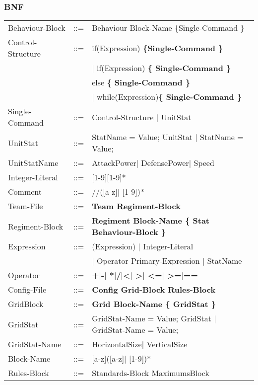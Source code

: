 	\subsubsection{BNF}
		\begin{tabular}{ l l l }
			Behaviour-Block	   &	::=	 & Behaviour Block-Name \{Single-Command \} \\
			Control-Structure  &  	::=  & if(Expression) \bf{\{}Single-Command \bf{\}}  \\
							   &		 & $\mid$ if(Expression) \bf{\{ }Single-Command \bf{\}} \\
							   &   		 & else \bf{\{ }Single-Command \bf{\} } \\					   
							   &   		 & $\mid$ while(Expression)\bf{\{ } Single-Command \bf{\}} \\
			Single-Command     &	::=  & Control-Structure $\mid$ UnitStat \\
			UnitStat		   &	::=  & StatName = Value; UnitStat $\mid$ StatName = Value; \\
			UnitStatName	   &	::=	 & AttackPower$\mid$ DefensePower$\mid$ Speed \\
			Integer-Literal    &	::=  & [1-9][1-9]* \\
			Comment			   &	::=	 & //([a-z]$\mid$ [1-9])* \\
			Team-File		   &	::=	 & \bf{Team} Regiment-Block \\
			Regiment-Block     &	::=	 & \bf{Regiment} Block-Name	 \bf{\{ } Stat Behaviour-Block \bf{\} }\\
			Expression		   &	::=  & (Expression) $\mid$ Integer-Literal \\
							   &		 &	$\mid$ Operator Primary-Expression $\mid$ StatName \\
			Operator 		   & 	::=	 & \bf{+}$\mid$\bf{-}$\mid$ \bf{*}$\mid$\bf{/}$\mid$\bf{<}$\mid$ \bf{>}$\mid$ \bf{<=}$\mid$ \bf{>=}$\mid$\bf{==}\\
			Config-File		   & 	::=  & \bf{Config} Grid-Block Rules-Block  		\\
			GridBlock		   &	::=	 & \bf{Grid} Block-Name	 \bf{\{} GridStat \bf{\}} \\
			GridStat		   &	::=  & GridStat-Name = Value; GridStat $\mid$ GridStat-Name = Value;   \\
			GridStat-Name	   &	::=  & HorizontalSize$\mid$ VerticalSize					\\
			Block-Name		   &	::=  & [a-z]([a-z]$\mid$ [1-9])* 							\\
			Rules-Block		   &	::=	 & Standards-Block MaximumsBlock 				\\

\end{tabular}
